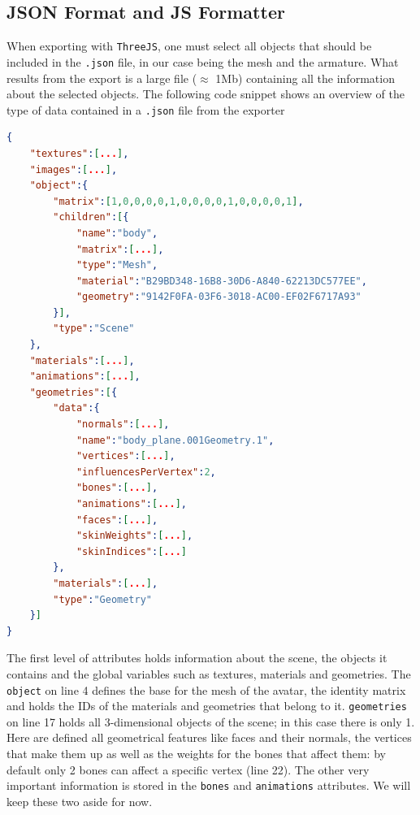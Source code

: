 \documentclass[12pt]{ociamthesis}  %
\begin{document}
\subsection{JSON Format and JS Formatter}
When exporting with \texttt{ThreeJS}, one must select all objects that should be included in the \texttt{.json} file, in our case being the mesh and the armature. What results from the export is a large file ($\approx$ 1Mb) containing all the information about the selected objects. The following code snippet shows an overview of the type of data contained in a \texttt{.json} file from the exporter
\begin{lstlisting}[language=json, caption = JSON file for \texttt{ThreeJS}, label = lst:object]
{
	"textures":[...],
	"images":[...],
	"object":{
		"matrix":[1,0,0,0,0,1,0,0,0,0,1,0,0,0,0,1],
		"children":[{
			"name":"body",
			"matrix":[...],
			"type":"Mesh",
			"material":"B29BD348-16B8-30D6-A840-62213DC577EE",
			"geometry":"9142F0FA-03F6-3018-AC00-EF02F6717A93"
		}],
		"type":"Scene"
	},
	"materials":[...],
	"animations":[...],
	"geometries":[{
		"data":{
			"normals":[...],
			"name":"body_plane.001Geometry.1",
			"vertices":[...],
			"influencesPerVertex":2,
			"bones":[...],
			"animations":[...],
			"faces":[...],
			"skinWeights":[...],
			"skinIndices":[...]
		},
		"materials":[...],
		"type":"Geometry"
	}]
}
\end{lstlisting}
The first level of attributes holds information about the scene, the objects it contains and the global variables such as textures, materials and geometries. The \texttt{object} on line 4 defines the base for the mesh of the avatar, the identity matrix and holds the IDs of the materials and geometries that belong to it. \texttt{geometries} on line 17 holds all 3-dimensional objects of the scene; in this case there is only 1. Here are defined all geometrical features like faces and their normals, the vertices that make them up as well as the weights for the bones that affect them: by default only 2 bones can affect a specific vertex (line 22). The other very important information is stored in the \texttt{bones} and \texttt{animations} attributes. We will keep these two aside for now.
\end{document}
